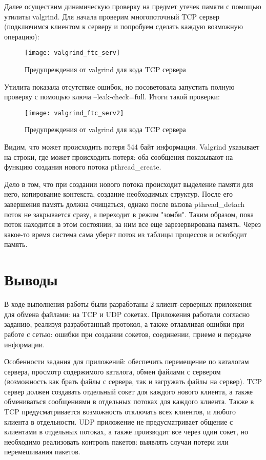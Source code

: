 Далее осуществим динамическую проверку на предмет утечек памяти с помощью утилиты valgrind. Для начала проверим многопоточный TCP сервер (подключимся клиентом к серверу и попробуем сделать каждую возможную операцию):
\begin{figure}[H]
	\begin{center}
		\texttt{[image: valgrind\_ftc\_serv]}
		\caption{Предупреждения от valgrind для кода TCP сервера} 
		\label{pic:valgr1} %
	\end{center}
\end{figure}
Утилита показала отсутствие ошибок, но посоветовала запустить полную проверку с помощью ключа --leak-check=full. 
Итоги такой проверки:
\begin{figure}[H]
	\begin{center}
		\texttt{[image: valgrind\_ftc\_serv2]}
		\caption{Предупреждения от valgrind для кода TCP сервера} 
		\label{pic:valgr2} %
	\end{center}
\end{figure}
Видим, что может происходить потеря 544 байт информации. Valgrind указывает на строки, где может происходить потеря: оба сообщения показывают на функцию создания нового потока pthread\_create. 

Дело в том, что при создании нового потока происходит выделение памяти для него, копирование контекста, создание необходимых структур. После его завершения память должна очищаться, однако после вызова pthread\_detach поток не закрывается сразу, а переходит в режим "зомби". Таким образом, пока поток находится в этом состоянии, за ним все еще зарезервирована память. Через какое-то время система сама уберет поток из таблицы процессов и освободит память.

\section{Выводы}
В ходе выполнения работы были разработаны 2 клиент-серверных приложения для обмена файлами: на TCP и UDP сокетах. Приложения работали согласно заданию, реализуя разработанный протокол, а также отлавливая ошибки при работе с сетью: ошибки при создании сокетов, соединении, приеме и передаче информации. 

Особенности задания для приложений: обеспечить перемещение по каталогам сервера, просмотр содержимого каталога, обмен файлами с сервером (возможность как брать файлы с сервера, так и загружать файлы на сервер). 
TCP сервер должен создавать отдельный сокет для каждого нового клиента, а также обмениваться сообщениями в отдельных потоках для каждого клиента. Также в TCP предусматривается возможность отключать всех клиентов, и любого клиента в отдельности.
UDP приложение не предусматривает общение с клиентами  в отдельных потоках, а также производит все через один сокет, но необходимо реализовать контроль пакетов: выявлять случаи потери или перемешивания пакетов.

